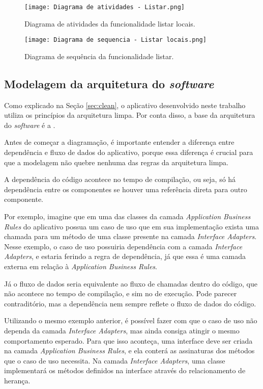 \begin{figure}[!htb]
  \centering
  \texttt{[image: Diagrama de atividades - Listar.png]}
  \caption{Diagrama de atividades da funcionalidade listar locais.}
  \label{fig:atividadelistar}
\end{figure}

\begin{figure}[!htb]
  \centering
  \texttt{[image: Diagrama de sequencia - Listar locais.png]}
  \caption{Diagrama de sequência da funcionalidade listar.}
  \label{fig:sequencialistar}
\end{figure}

\subsection{Modelagem da arquitetura do \textit{software}}
Como explicado na Seção \ref{sec:clean}, o aplicativo desenvolvido neste trabalho utiliza os princípios da arquitetura limpa. Por conta disso, a base da arquitetura do \textit{software} é a .

Antes de começar a diagramação, é importante entender a diferença entre dependência e fluxo de dados do aplicativo, porque essa diferença é crucial para que a modelagem não quebre nenhuma das regras da arquitetura limpa.

A dependência do código acontece no tempo de compilação, ou seja, só há dependência entre os componentes se houver uma referência direta para outro componente.

Por exemplo, imagine que em uma das classes da camada \textit{Application Business Rules} do aplicativo possua um caso de uso que em sua implementação exista uma chamada para um método de uma classe presente na camada \textit{Interface Adapters}. Nesse exemplo, o caso de uso possuiria dependência com a camada \textit{Interface Adapters}, e estaria ferindo a regra de dependência, já que essa é uma camada externa em relação à \textit{Application Business Rules}.

Já o fluxo de dados seria equivalente ao fluxo de chamadas dentro do código, que não acontece no tempo de compilação, e sim no de execução. Pode parecer contraditório, mas a dependência nem sempre reflete o fluxo de dados do código.

Utilizando o mesmo exemplo anterior, é possível fazer com que o caso de uso não dependa da camada \textit{Interface Adapters}, mas ainda consiga atingir o mesmo comportamento esperado. Para que isso aconteça, uma interface deve ser criada na camada \textit{Application Business Rules}, e ela conterá as assinaturas dos métodos que o caso de uso necessita. Na camada \textit{Interface Adapters}, uma classe implementará os métodos definidos na interface através do relacionamento de herança.

